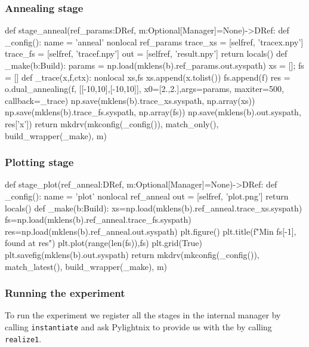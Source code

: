 \subsubsection{Annealing stage}

\begin{pythontexcode}
def stage_anneal(ref_params:DRef, m:Optional[Manager]=None)->DRef:
  def _config():
    name = 'anneal'
    nonlocal ref_params
    trace_xs = [selfref, 'tracex.npy']
    trace_fs = [selfref, 'tracef.npy']
    out = [selfref, 'result.npy']
    return locals()
  def _make(b:Build):
    params = np.load(mklens(b).ref_params.out.syspath)
    xs = []; fs = []
    def _trace(x,f,ctx):
      nonlocal xs,fs
      xs.append(x.tolist())
      fs.append(f)
    res = o.dual_annealing(f, [[-10,10],[-10,10]],
                         x0=[2.,2.],args=params,
                         maxiter=500, callback=_trace)
    np.save(mklens(b).trace_xs.syspath, np.array(xs))
    np.save(mklens(b).trace_fs.syspath, np.array(fs))
    np.save(mklens(b).out.syspath, res['x'])
  return mkdrv(mkconfig(_config()), match_only(), build_wrapper(_make), m)
\end{pythontexcode}

\subsubsection{Plotting stage}

\begin{pythontexcode}
def stage_plot(ref_anneal:DRef, m:Optional[Manager]=None)->DRef:
  def _config():
    name = 'plot'
    nonlocal ref_anneal
    out = [selfref, 'plot.png']
    return locals()
  def _make(b:Build):
    xs=np.load(mklens(b).ref_anneal.trace_xs.syspath)
    fs=np.load(mklens(b).ref_anneal.trace_fs.syspath)
    res=np.load(mklens(b).ref_anneal.out.syspath)
    plt.figure()
    plt.title(f"Min {fs[-1]}, found at {res}")
    plt.plot(range(len(fs)),fs)
    plt.grid(True)
    plt.savefig(mklens(b).out.syspath)
  return mkdrv(mkconfig(_config()), match_latest(), build_wrapper(_make), m)
\end{pythontexcode}

\subsubsection{Running the experiment}

To run the experiment we register all the stages in the internal manager by
calling \texttt{instantiate} and ask Pylightnix to provide us with the
 by calling
\texttt{realize1}.

